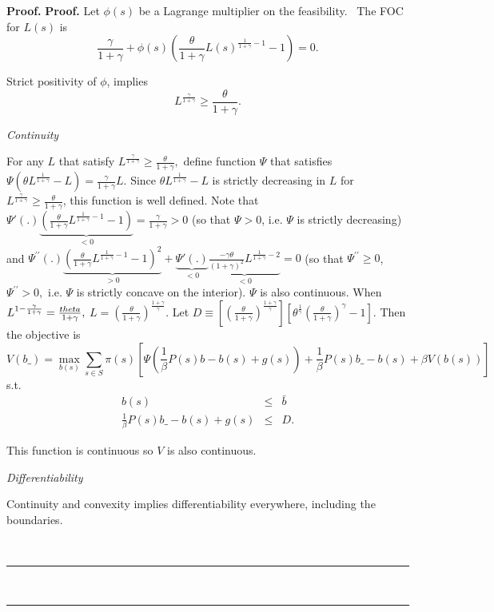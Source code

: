 \documentclass[thmsb,11pt]{article}
\newenvironment{proof}[1][Proof]{\noindent \textbf{#1.} }{\  \rule{0.5em}{0.5em}}
\begin{document}
\begin{proof}
\begin{proof}
Let $\phi(s)$ be a Lagrange multiplier on the
feasibility. \ The FOC for $L\left( s\right) $ is
\[
\frac{\gamma}{1+\gamma }+\phi(s) \left( \frac{\theta}{1+\gamma }L(s)^{\frac{1}{1+\gamma}
-1}-1 \right) =0.
\]%

Strict positivity of $\phi$, implies
\[
L^{\frac{\gamma}{1+\gamma} }\geq \frac{\theta }{1+\gamma }.
\]

\textit{Continuity}

For any $L$ that satisfy $L^{\frac{\gamma}{1+\gamma} }\geq \frac{\theta }{1+\gamma} ,$ define function $%
\Psi $ that satisfies $\Psi \left( \theta L^{\frac{1}{1+\gamma} }-L\right) =\frac{\gamma}{1+\gamma}L.$ Since $%
\theta L^{\frac{1}{1+\gamma} }-L$ is strictly decreasing in $L$ for $L^{\frac{\gamma}{1+\gamma} }\geq
\frac{\theta}{1+\gamma} $, this function is well defined. Note that $\Psi'(.)  \underbrace{\left( \frac{\theta}{1+\gamma }L^{\frac{1}{1+\gamma} -1}-1 \right) }%
_{<0}=\frac{\gamma}{1+\gamma}>0$ (so that $\Psi >0$, i.e. $\Psi $ is strictly decreasing)
and $\Psi ^{\prime \prime }(.)\underbrace{\left( \frac{\theta}{1+\gamma }L^{\frac{1}{1+\gamma}-1}-1\right) ^{2}}_{>0}+\underbrace{\Psi'(.) }_{<0}\underbrace{\frac{-\gamma \theta
}{(1+\gamma)^2 }L^{\frac{1}{1+\gamma} -2}}_{<0}=0$ (so that $\Psi
^{\prime \prime }\geq 0$, $\Psi ^{\prime \prime }>0,$ i.e. $\Psi $ is
strictly concave on the interior). $\Psi $ is also continuous. When $%
L^{1-\frac{\gamma}{1+\gamma} }=\frac{\\theta}{1+\gamma} ,$ $L=\left(\frac{\theta}{1+\gamma}\right)^{\frac{1+\gamma}{\gamma}}.$
Let $D\equiv \left[\left(\frac{\theta}{1+\gamma}\right)^{\frac{1+\gamma}{\gamma}}\right]\left[\theta^{\frac{1}{\gamma}}\left(\frac{\theta}{1+\gamma}\right)^{\gamma}-1\right].$ Then the objective is
\[
V\left( b\_\right) =\max_{b\left( s\right) }\sum_{s\in S}\pi \left(
s\right) \left[ \Psi \left( \frac{1}{\beta }P\left( s\right) b-b\left(
s\right) +g\left( s\right) \right) +\frac{1}{\beta }P\left( s\right)
b\_-b\left( s\right) +\beta V\left( b\left( s\right) \right) \right]
\]%
s.t.%
\begin{eqnarray*}
b\left( s\right) &\leq &\bar{b} \\
\frac{1}{\beta }P\left( s\right) b\_-b\left( s\right) +g\left( s\right) &\leq
&D.
\end{eqnarray*}

This function is continuous so $V$ is also continuous.

\textit{Differentiability}

Continuity and convexity implies differentiability everywhere, including the
boundaries.


\end{proof}
\end{proof}
\end{document}
